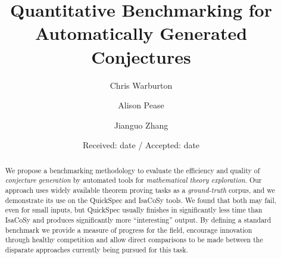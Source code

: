 


\title{Quantitative Benchmarking for Automatically Generated Conjectures%
}


\author{Chris Warburton \and
        Alison Pease    \and
        Jianguo Zhang}



\date{Received: date / Accepted: date}

\maketitle

\begin{abstract}
  We propose a benchmarking methodology to evaluate the efficiency and quality
  of \emph{conjecture generation} by automated tools for \emph{mathematical
    theory exploration}. Our approach uses widely available theorem proving
  tasks as a \emph{ground-truth} corpus, and we demonstrate its use on the
  QuickSpec and IsaCoSy tools. We found that both may fail, even for small
  inputs, but QuickSpec usually finishes in significantly less time than IsaCoSy
  and produces significantly more ``interesting'' output. By defining a standard
  benchmark we provide a measure of progress for the field, encourage
  innovation through healthy competition and allow direct comparisons to be made
  between the disparate approaches currently being pursued for this task.
\end{abstract}

